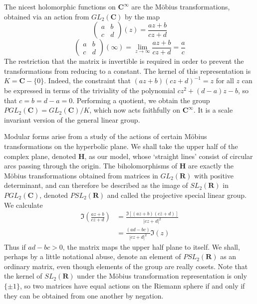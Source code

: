 The nicest holomorphic functions on $\mathbf{C}^\infty$ are the M\"{o}bius transformations, obtained via an action from $GL_2(\mathbf{C})$ by the map
%
\[ \begin{pmatrix} a & b \\ c & d \end{pmatrix}(z)  = \frac{az + b}{cz + d} \]
%
\[ \begin{pmatrix} a & b \\ c & d \end{pmatrix}(\infty) = \lim_{z \to \infty } \frac{az + b}{cz + d} = \frac{a}{c} \]
%
The restriction that the matrix is invertible is required in order to prevent the transformations from reducing to a constant. The kernel of this representation is $K = \mathbf{C} - \{ 0 \}$. Indeed, the constraint that $(az + b)(cz + d)^{-1} = z$ for all $z$ can be expressed in terms of the triviality of the polynomial $cz^2 + (d-a)z - b$, so that $c = b = d-a = 0$. Performing a quotient, we obtain the group $PGL_2(\mathbf{C}) = GL_2(\mathbf{C})/K$, which now acts faithfully on $\mathbf{C}^\infty$. It is a scale invariant version of the general linear group.

Modular forms arise from a study of the actions of certain M\"{o}bius transformations on the hyperbolic plane. We shall take the upper half of the complex plane, denoted $\mathbf{H}$, as our model, whose `straight lines' consist of circular arcs passing through the origin. The biholomorphisms of $\mathbf{H}$ are exactly the M\"{o}bius transformations obtained from matrices in $GL_2(\mathbf{R})$ with positive determinant, and can therefore be described as the image of $SL_2(\mathbf{R})$ in $PGL_2(\mathbf{C})$, denoted $PSL_2(\mathbf{R})$ and called the projective special linear group. We calculate
%
\begin{align*}
    \Im \left( \frac{az + b}{cz + d} \right) &= \frac{\Im[(az + b)(c\overline{z} + d)]}{|cz + d|^2}\\
    &= \frac{(ad - bc)}{|cz + d|^2} \Im(z)
\end{align*}
%
Thus if $ad - bc > 0$, the matrix maps the upper half plane to itself. We shall, perhaps by a little notational abuse, denote an element of $PSL_2(\mathbf{R})$ as an ordinary matrix, even though elements of the group are really cosets. Note that the kernel of $SL_2(\mathbf{R})$ under the M\"{o}bius transformation representation is only $\{ \pm 1 \}$, so two matrices have equal actions on the Riemann sphere if and only if they can be obtained from one another by negation.

